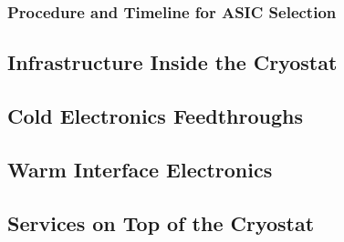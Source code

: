 \subsubsection{Procedure and Timeline for ASIC Selection}
\label{sec:fdsp-tpcelec-design-femb-selection}

\subsection{Infrastructure Inside the Cryostat}
\label{sec:fdsp-tpcelec-design-infrastructure}

\subsection{Cold Electronics Feedthroughs}
\label{sec:fdsp-tpcelec-design-ft}

\subsection{Warm Interface Electronics}
\label{sec:fdsp-tpcelec-design-warm}

\subsection{Services on Top of the Cryostat}
\label{sec:fdsp-tpcelec-design-services}
